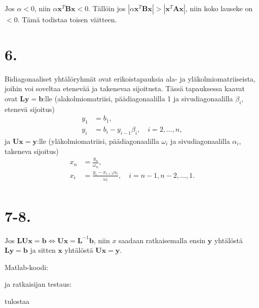 \documentclass{article}
\begin{document}
Jos $\alpha < 0$, niin $\alpha\mathbf{x}^T\mathbf{Bx} < 0$. Tällöin jos
$|\alpha\mathbf{x}^T\mathbf{Bx}| > |\mathbf{x}^T\mathbf{Ax}|$, niin koko lauseke on $< 0$.
Tämä todistaa toisen väitteen.


\section*{6.}

Bidiagonaaliset yhtälöryhmät ovat erikoistapauksia ala- ja yläkolmiomatriiseista,
joihin voi soveltaa etenevää ja takenevaa sijoitusta.
Tässä tapauksessa kaavat ovat $\mathbf{Ly} = \mathbf{b}$:lle (alakolmiomatriisi,
päädiagonaalilla 1 ja sivudiagonaalilla $\beta_i$, ete\-nevä sijoitus)
\begin{align*}
  y_1 &= b_1, \\
  y_i &= b_i - y_{i-1}\beta_{i}, \quad i = 2,\dots,n,
\end{align*}
ja $\mathbf{Ux} = \mathbf{y}$:lle (yläkolmiomatriisi, päädiagonaalilla
$\omega_i$ ja sivudiagonaalilla $\alpha_i$, takeneva sijoitus)
\begin{align*}
  x_n &= \frac{y_n}{\omega_n}, \\
  x_i &= \frac{y_i - x_{i+1}\alpha_{i}}{\omega_{i}}, \quad i = n-1,n-2,\dots,1. \\
\end{align*}


\section*{7-8.}

Jos $\mathbf{LUx} = \mathbf{b} \iff \mathbf{Ux} = \mathbf{L}^{-1}\mathbf{b}$, niin
$x$ saadaan ratkaisemalla ensin $\mathbf{y}$ yhtälöstä $\mathbf{Ly} = \mathbf{b}$
ja sitten $\mathbf{x}$ yhtälöstä $\mathbf{Ux} = \mathbf{y}$.

Matlab-koodi:



ja ratkaisijan testaus:



tulostaa


\end{document}
